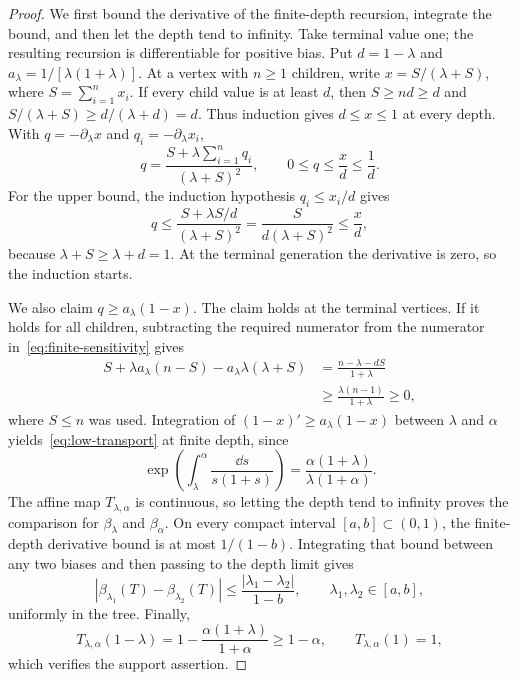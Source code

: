 \begin{proof}
We first bound the derivative of the finite-depth recursion, integrate the bound, and then let the depth tend to infinity. Take terminal value one; the resulting recursion is differentiable for positive bias. Put $d=1-\lambda$ and $a_\lambda=1/[\lambda(1+\lambda)]$. At a vertex with $n\ge1$ children, write $x=S/(\lambda+S)$, where $S=\sum_{i=1}^n x_i$. If every child value is at least $d$, then $S\ge nd\ge d$ and $S/(\lambda+S)\ge d/(\lambda+d)=d$. Thus induction gives $d\le x\le1$ at every depth. With $q=-\partial_\lambda x$ and $q_i=-\partial_\lambda x_i$,
\begin{equation}\label{eq:finite-sensitivity}
 q=\frac{S+\lambda\sum_{i=1}^n q_i}{(\lambda+S)^2},
 \qquad 0\le q\le\frac{x}{d}\le\frac1d.
\end{equation}
For the upper bound, the induction hypothesis $q_i\le x_i/d$ gives
\[
 q\le\frac{S+\lambda S/d}{(\lambda+S)^2}
 =\frac{S}{d(\lambda+S)^2}
 \le\frac{x}{d},
\]
because $\lambda+S\ge\lambda+d=1$. At the terminal generation the derivative is zero, so the induction starts.

We also claim $q\ge a_\lambda(1-x)$. The claim holds at the terminal vertices. If it holds for all children, subtracting the required numerator from the numerator in~\eqref{eq:finite-sensitivity} gives
\begin{align*}
 S+\lambda a_\lambda(n-S)-a_\lambda\lambda(\lambda+S)
 &=\frac{n-\lambda-dS}{1+\lambda}\\
 &\ge\frac{\lambda(n-1)}{1+\lambda}\ge0,
\end{align*}
where $S\le n$ was used. Integration of $(1-x)'\ge a_\lambda(1-x)$ between $\lambda$ and $\alpha$ yields~\eqref{eq:low-transport} at finite depth, since
\begin{equation*}
 \exp\left(\int_\lambda^\alpha\frac{\dd s}{s(1+s)}\right)
 =\frac{\alpha(1+\lambda)}{\lambda(1+\alpha)}.
\end{equation*}
The affine map $T_{\lambda,\alpha}$ is continuous, so letting the depth tend to infinity proves the comparison for $\beta_\lambda$ and $\beta_\alpha$. On every compact interval $[a,b]\subset(0,1)$, the finite-depth derivative bound is at most $1/(1-b)$. Integrating that bound between any two biases and then passing to the depth limit gives
\[
 |\beta_{\lambda_1}(T)-\beta_{\lambda_2}(T)|
 \le\frac{|\lambda_1-\lambda_2|}{1-b},
 \qquad \lambda_1,\lambda_2\in[a,b],
\]
uniformly in the tree. Finally,
\begin{equation*}
 T_{\lambda,\alpha}(1-\lambda)
 =1-\frac{\alpha(1+\lambda)}{1+\alpha}\ge1-\alpha,
 \qquad T_{\lambda,\alpha}(1)=1,
\end{equation*}
which verifies the support assertion.
\end{proof}

